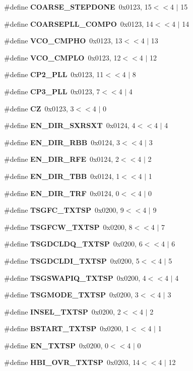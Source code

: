 \begin{DoxyCompactItemize}
\#define {\bf C\+O\+A\+R\+S\+E\+\_\+\+S\+T\+E\+P\+D\+O\+NE}~0x0123, 15$<$$<$4 $\vert$  15
\item 
\#define {\bf C\+O\+A\+R\+S\+E\+P\+L\+L\+\_\+\+C\+O\+M\+PO}~0x0123, 14$<$$<$4 $\vert$  14
\item 
\#define {\bf V\+C\+O\+\_\+\+C\+M\+P\+HO}~0x0123, 13$<$$<$4 $\vert$  13
\item 
\#define {\bf V\+C\+O\+\_\+\+C\+M\+P\+LO}~0x0123, 12$<$$<$4 $\vert$  12
\item 
\#define {\bf C\+P2\+\_\+\+P\+LL}~0x0123, 11$<$$<$4 $\vert$  8
\item 
\#define {\bf C\+P3\+\_\+\+P\+LL}~0x0123, 7$<$$<$4 $\vert$  4
\item 
\#define {\bf CZ}~0x0123, 3$<$$<$4 $\vert$  0
\item 
\#define {\bf E\+N\+\_\+\+D\+I\+R\+\_\+\+S\+X\+R\+S\+XT}~0x0124, 4$<$$<$4 $\vert$  4
\item 
\#define {\bf E\+N\+\_\+\+D\+I\+R\+\_\+\+R\+BB}~0x0124, 3$<$$<$4 $\vert$  3
\item 
\#define {\bf E\+N\+\_\+\+D\+I\+R\+\_\+\+R\+FE}~0x0124, 2$<$$<$4 $\vert$  2
\item 
\#define {\bf E\+N\+\_\+\+D\+I\+R\+\_\+\+T\+BB}~0x0124, 1$<$$<$4 $\vert$  1
\item 
\#define {\bf E\+N\+\_\+\+D\+I\+R\+\_\+\+T\+RF}~0x0124, 0$<$$<$4 $\vert$  0
\item 
\#define {\bf T\+S\+G\+F\+C\+\_\+\+T\+X\+T\+SP}~0x0200, 9$<$$<$4 $\vert$  9
\item 
\#define {\bf T\+S\+G\+F\+C\+W\+\_\+\+T\+X\+T\+SP}~0x0200, 8$<$$<$4 $\vert$  7
\item 
\#define {\bf T\+S\+G\+D\+C\+L\+D\+Q\+\_\+\+T\+X\+T\+SP}~0x0200, 6$<$$<$4 $\vert$  6
\item 
\#define {\bf T\+S\+G\+D\+C\+L\+D\+I\+\_\+\+T\+X\+T\+SP}~0x0200, 5$<$$<$4 $\vert$  5
\item 
\#define {\bf T\+S\+G\+S\+W\+A\+P\+I\+Q\+\_\+\+T\+X\+T\+SP}~0x0200, 4$<$$<$4 $\vert$  4
\item 
\#define {\bf T\+S\+G\+M\+O\+D\+E\+\_\+\+T\+X\+T\+SP}~0x0200, 3$<$$<$4 $\vert$  3
\item 
\#define {\bf I\+N\+S\+E\+L\+\_\+\+T\+X\+T\+SP}~0x0200, 2$<$$<$4 $\vert$  2
\item 
\#define {\bf B\+S\+T\+A\+R\+T\+\_\+\+T\+X\+T\+SP}~0x0200, 1$<$$<$4 $\vert$  1
\item 
\#define {\bf E\+N\+\_\+\+T\+X\+T\+SP}~0x0200, 0$<$$<$4 $\vert$  0
\item 
\#define {\bf H\+B\+I\+\_\+\+O\+V\+R\+\_\+\+T\+X\+T\+SP}~0x0203, 14$<$$<$4 $\vert$  12

\end{DoxyCompactItemize}
